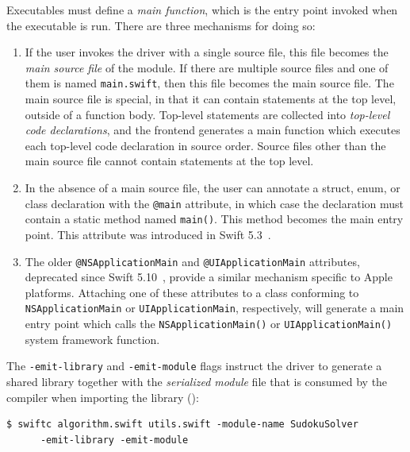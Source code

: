 \documentclass[../generics]{subfiles}
\begin{document}
Executables must define a \emph{main function}, which is the entry point invoked when the executable is run. There are three mechanisms for doing so:
\begin{enumerate}
\item If the user invokes the driver with a single source file, this file becomes the \emph{main source file} of the module. If there are multiple source files and one of them is named \texttt{main.swift}, then this file becomes the main source file. The main source file is special, in that it can contain statements at the top level, outside of a function body. Top-level statements are collected into \emph{top-level code declarations}, and the frontend generates a main function which executes each top-level code declaration in source order. Source files other than the main source file cannot contain statements at the top level.
\item In the absence of a main source file, the user can annotate a struct, enum, or class declaration with the \texttt{@main} attribute, in which case the declaration must contain a static method named \texttt{main()}. This method becomes the main entry point. This attribute was introduced in Swift 5.3~\cite{se0281}.
\item The older \texttt{@NSApplicationMain} and \texttt{@UIApplicationMain} attributes, deprecated since Swift 5.10~\cite{se0383}, provide a similar mechanism specific to Apple platforms. Attaching one of these attributes to a class conforming to \texttt{NSApplicationMain} or \texttt{UIApplicationMain}, respectively, will generate a main entry point which calls the \texttt{NSApplicationMain()} or \texttt{UIApplicationMain()} system framework function.
\end{enumerate}

The \texttt{-emit-library} and \texttt{-emit-module} flags instruct the driver to generate a shared library together with the \emph{serialized module} file that is consumed by the compiler when importing the library ():
\begin{Verbatim}
$ swiftc algorithm.swift utils.swift -module-name SudokuSolver
      -emit-library -emit-module
\end{Verbatim}
\end{document}
